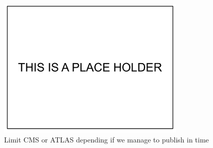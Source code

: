  
\begin{figure}[tp]
     \begin{center}

            \includegraphics[width=0.8\textwidth]{figure/blank.pdf}

    \end{center}
    \caption{Limit CMS or ATLAS depending if we manage to publish in time}


   \label{fig:ex2}
\end{figure}




















